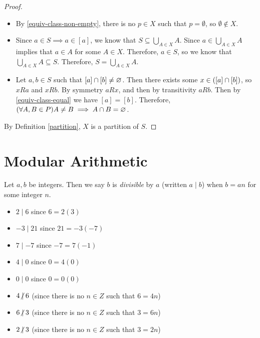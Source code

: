 \begin{proof}\proofbreak
    \begin{itemize}
        \item By \ref{equiv-class-non-empty}, there is no $p \in X$ such that $p = \emptyset$, so $\emptyset \notin X$.
        \item Since $a \in S \implies a \in \left[a\right]$, we know that $S \subseteq \bigcup_{A\in X}A$. Since $a \in \bigcup_{A\in X}A$ implies that $a \in A$ for some $A \in X$. Therefore, $a \in S$, so we know that $\bigcup_{A\in X}A \subseteq S$. Therefore, $S = \bigcup_{A\in X}A$.
        \item Let $a, b \in S$ such that $\left[a\right] \cap \left[b\right] \neq \varnothing$. Then there exists some $x \in (\left[a\right] \cap \left[b\right])$, so $x R a$ and $x R b$. By symmetry $a R x$, and then by transitivity $a R b$. Then by \ref{equiv-class-equal} we have $\left[a\right] = \left[b\right]$. Therefore, $(\forall A, B \in P) A \neq B \implies A \cap B = \varnothing$.
    \end{itemize}
    By Definition \ref{partition}, $X$ is a partition of $S$.
\end{proof}

\section{Modular Arithmetic}

\begin{defn}\label{divisible}
    Let $a, b$ be integers. Then we say $b$ is \emph{divisible} by $a$ (written $a \mid b$) when $b = an$ for some integer $n$.
\end{defn}

\begin{exmp}\proofbreak
    \begin{itemize}
        \item $2 \mid 6$ since $6 = 2(3)$
        \item $-3 \mid 21$ since $21 = -3(-7)$
        \item $7 \mid {-7}$ since $-7 = 7(-1)$
        \item $4 \mid 0$ since $0 = 4(0)$
        \item $0 \mid 0$ since $0 = 0(0)$
    \end{itemize}
\end{exmp}

\begin{exmp}\proofbreak
    \begin{itemize}
        \item $4 \centernot\mid 6$ (since there is no $n \in Z$ such that $6 = 4n$)
        \item $6 \centernot\mid 3$ (since there is no $n \in Z$ such that $3 = 6n$)
        \item $2 \centernot\mid 3$ (since there is no $n \in Z$ such that $3 = 2n$)
    \end{itemize}
\end{exmp}

